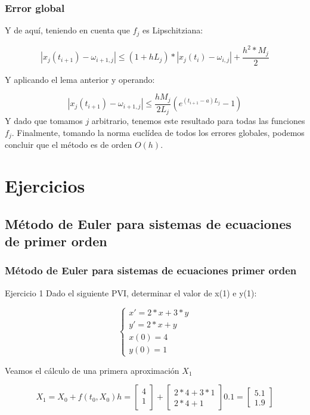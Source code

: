 \documentclass{beamer}
\begin{document}
\begin{frame}
	\frametitle{Error global}
	Y de aquí, teniendo en cuenta que $f_j$ es Lipschitziana:
	
	$$ | x_j(t_{i+1}) - \omega_{i+1,j} | \leq (1+hL_j)*| x_j(t_i) - \omega_{i,j} | + \frac{h^2*M_j}{2} $$
	
	Y aplicando el lema anterior y operando:
	
	$$ | x_j(t_{i+1}) - \omega_{i+1, j} | \leq \frac{hM_j}{2L_j}(e^{(t_{i+1}-a)L_j} - 1) $$
	Y dado que tomamos $j$ arbitrario, tenemos este resultado para todas las funciones $f_j$. Finalmente, tomando la norma euclídea de todos los errores globales, podemos concluir que el método es de orden $O(h)$.
\end{frame}


\section{Ejercicios}

\subsection{Método de Euler para sistemas de ecuaciones de primer orden}

\begin{frame}
	\frametitle{Método de Euler para sistemas de ecuaciones primer orden}
	\begin{block}{Ejercicio 1}
		Dado el siguiente PVI, determinar el valor de x(1) e y(1):
		
		$$
		\begin{cases}
		x' = 2*x + 3 * y\\
		y' = 2*x + y \\
		x(0) = 4\\
		y(0)=1
		\end{cases}
		$$
	\end{block}
	
	Veamos el cálculo de una primera aproximación $X_1$
	
	\begin{equation*}
	X_1=X_0+f(t_0,X_0)h=\begin{bmatrix}
	4\\
	1\\
	\end{bmatrix} + \begin{bmatrix}
	2*4 +3*1\\
	2*4 + 1
	\end{bmatrix}0.1=\begin{bmatrix}
	5.1\\
	1.9
	\end{bmatrix}  
	\end{equation*}
	
\end{frame}
\end{document}
